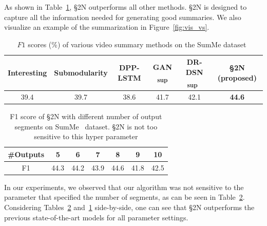 \documentclass[10pt,journal,compsoc]{IEEEtran}
\begin{document}
 As shown in Table~\ref{results:vssum}, \S2N outperforms all other methods. \S2N is designed to capture all the information needed for generating good summaries. We also visualize an example of the summarization in Figure~\ref{fig:vis_vs}. 

\begin{table}
\small
\setlength{\tabcolsep}{5pt}
\centering
\caption{$F1$ scores (\%) of various video summary methods on the SumMe dataset~\cite{gygli2014creating} \label{results:vssum}}
\begin{tabular}{ c  c  c  c  c  c }
\toprule
 Interesting \cite{gygli2014creating} & Submodularity \cite{gygli2015video}  & DPP-LSTM \cite{zhang2016video} & GAN \textsubscript{sup} \cite{mahasseni2017unsupervised} & DR-DSN \textsubscript{sup}~\cite{zhou2017deep} & \S2N (proposed)\\
\midrule
 39.4 & 39.7 & 38.6 & 41.7& 42.1 & \textbf{44.6} \\
\bottomrule
\end{tabular}
\setlength{\tabcolsep}{0.1cm}
\end{table}


\begin{table}
 \centering
 \caption{F1 score of \S2N with different number of output segments on SumMe~\cite{gygli2014creating} dataset. \S2N is not too sensitive to this hyper parameter\label{tab:vary_len}}
 \begin{tabular}{ccccccc}
 \toprule
 \#Outputs  &  5 &  6 & 7 & 8 & 9 & 10  \\
 \midrule
 F1 &  44.3 & 44.2 & 43.9 & 44.6 & 41.8 & 42.5 \\
 \bottomrule
 \end{tabular}
 \end{table}

In our experiments, we observed that our algorithm was not sensitive to the parameter that specified the number of segments, as can be seen in Table~\ref{tab:vary_len}. Considering Tables~\ref{tab:vary_len} and~\ref{results:vssum} side-by-side, one can see that \S2N outperforms the previous state-of-the-art models for all parameter settings. 
\end{document}
